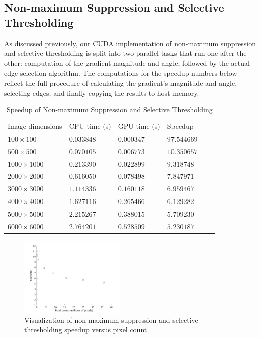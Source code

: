 \documentclass[journal]{IEEEtran}
\begin{document}
\subsection{Non-maximum Suppression and Selective Thresholding}
As discussed previously, our CUDA implementation of non-maximum suppression and selective thresholding is split into two parallel tasks that run one after the other: computation of the gradient magnitude and angle, followed by the actual edge selection algorithm. The computations for the speedup numbers below reflect the full procedure of calculating the gradient's magnitude and angle, selecting edges, and finally copying the results to host memory.
\begin{table}[H]
	\small
	\centering
	\caption{Speedup of Non-maximum Suppression and Selective Thresholding}
	\label{non-maximum-suppression-selective-thresholding-speedup}
	\begin{tabular}{llllll}
	 Image dimensions & CPU time (s) & GPU time (s) & Speedup \\
	 $100 \times 100$ & $0.033848$ & $0.000347$ & $97.544669$ \\
	 $500 \times 500$ & $0.070105$ & $0.006773$ & $10.350657$ \\
	 $1000 \times 1000$ & $0.213390$ & $0.022899$ & $9.318748$ \\
	 $2000 \times 2000$ & $0.616050$ & $0.078498$ & $7.847971$ \\
	 $3000 \times 3000$ & $1.114336$ & $0.160118$ & $6.959467$ \\
	 $4000 \times 4000$ & $1.627116$ & $0.265466$ & $6.129282$ \\
	 $5000 \times 5000$ & $2.215267$ & $0.388015$ & $5.709230$ \\
	 $6000 \times 6000$ & $2.764201$ & $0.528509$ & $5.230187$ \\
	\end{tabular}
\end{table}
\begin{figure}[h]
	\centering
	\includegraphics[width=0.45\textwidth]{non_maximum_suppression_selective_thresholding_speedup_graph.jpg}
	\caption{Visualization of non-maximum suppression and selective thresholding speedup versus pixel count}
    \label{non-maximum-suppression-selective-thresholding-speedup-graph}
\end{figure}
\end{document}
